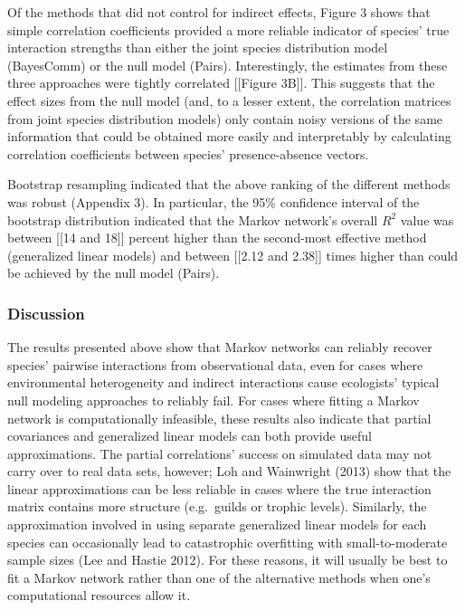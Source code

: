 \documentclass[12pt,]{article}
\begin{document}
\begin{spacing}{1.9}
\begin{flushleft}
Of the methods that did not control for indirect effects, Figure 3 shows
that simple correlation coefficients provided a more reliable indicator
of species' true interaction strengths than either the joint species
distribution model (BayesComm) or the null model (Pairs). Interestingly,
the estimates from these three approaches were tightly correlated
{[}{[}Figure 3B{]}{]}. This suggests that the effect sizes from the null
model (and, to a lesser extent, the correlation matrices from joint
species distribution models) only contain noisy versions of the same
information that could be obtained more easily and interpretably by
calculating correlation coefficients between species' presence-absence
vectors.

Bootstrap resampling indicated that the above ranking of the different
methods was robust (Appendix 3). In particular, the 95\% confidence
interval of the bootstrap distribution indicated that the Markov
network's overall \(R^2\) value was between {[}{[}14 and 18{]}{]}
percent higher than the second-most effective method (generalized linear
models) and between {[}{[}2.12 and 2.38{]}{]} times higher than could be
achieved by the null model (Pairs).

\subsubsection{Discussion}\label{discussion}

The results presented above show that Markov networks can reliably
recover species' pairwise interactions from observational data, even for
cases where environmental heterogeneity and indirect interactions cause
ecologists' typical null modeling approaches to reliably fail. For cases
where fitting a Markov network is computationally infeasible, these
results also indicate that partial covariances and generalized linear
models can both provide useful approximations. The partial correlations'
success on simulated data may not carry over to real data sets, however;
Loh and Wainwright (2013) show that the linear approximations can be
less reliable in cases where the true interaction matrix contains more
structure (e.g.~guilds or trophic levels). Similarly, the approximation
involved in using separate generalized linear models for each species
can occasionally lead to catastrophic overfitting with small-to-moderate
sample sizes (Lee and Hastie 2012). For these reasons, it will usually
be best to fit a Markov network rather than one of the alternative
methods when one's computational resources allow it.


\end{flushleft}
\end{spacing}
\end{document}
